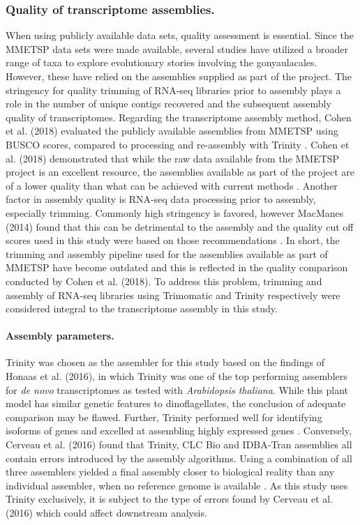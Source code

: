 \documentclass[fleqn,10pt,lineno]{wlpeerj} %
\begin{document}
\subsubsection*{Quality of transcriptome assemblies.}
When using publicly available data sets, quality assessment is essential. 
Since the MMETSP data sets were made available, several studies have utilized a broader range of taxa to explore evolutionary stories involving the gonyaulacales. 
However, these have relied on the assemblies supplied as part of the project. 
The stringency for quality trimming of RNA-seq libraries prior to assembly plays a role in the number of unique contigs recovered and the subsequent assembly quality of transcriptomes. 
Regarding the transcriptome assembly method, Cohen et al. (2018) evaluated the publicly available assemblies from MMETSP using BUSCO scores, compared to processing and re-assembly with Trinity \cite{cohen2018mmetsp}. 
Cohen et al. (2018) demonstrated that while the raw data available from the MMETSP project is an excellent resource, the assemblies available as part of the project are of a lower quality than what can be achieved with current methods \cite{cohen2018mmetsp}. 
Another factor in assembly quality is RNA-seq data processing prior to assembly, especially trimming. 
Commonly high stringency is favored, however MacManes (2014) found that this can be detrimental to the assembly and the quality cut off scores used in this study were based on those recommendations \cite{macmanes2014optimal}.
In short, the trimming and assembly pipeline used for the assemblies available as part of MMETSP have become outdated and this is reflected in the quality comparison conducted by Cohen et al. (2018).
To address this problem, trimming and assembly of RNA-seq libraries using Trimomatic and Trinity respectively were considered integral to the transcriptome assembly in this study.
\paragraph*{Assembly parameters.}
Trinity was chosen as the assembler for this study based on the findings of Honaas et al. (2016), in which Trinity was one of the top performing assemblers for \textit{de novo} transcriptomes as tested with \textit{Arabidopsis thaliana}. 
While this plant model has similar genetic features to dinoflagellates, the conclusion of adequate comparison may be flawed.
Further, Trinity performed well for identifying isoforms of genes and excelled at assembling highly expressed genes \cite{honaas2016selecting}.
Conversely, Cerveau et al. (2016) found that Trinity, CLC Bio and IDBA-Tran assemblies all contain errors introduced by the assembly algorithms. 
Using a combination of all three assemblers yielded a final assembly closer to biological reality than any individual assembler, when no reference genome is available \cite{cerveau2016combining}.
As this study uses Trinity exclusively, it is subject to the type of errors found by Cerveau et al. (2016) which could affect downstream analysis.
\end{document}
